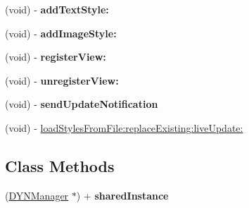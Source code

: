 \begin{DoxyCompactItemize}
\item 
\hypertarget{interface_d_y_n_manager_ae78aea4a00bc874e34cfbd398207f856}{(void) -\/ {\bfseries add\-Text\-Style\-:}}\label{interface_d_y_n_manager_ae78aea4a00bc874e34cfbd398207f856}

\item 
\hypertarget{interface_d_y_n_manager_a9b4b3382af4c326e40a743442ba79f2a}{(void) -\/ {\bfseries add\-Image\-Style\-:}}\label{interface_d_y_n_manager_a9b4b3382af4c326e40a743442ba79f2a}

\item 
\hypertarget{interface_d_y_n_manager_a300c40eaa2d1bc72781fbc9157ecb9c8}{(void) -\/ {\bfseries register\-View\-:}}\label{interface_d_y_n_manager_a300c40eaa2d1bc72781fbc9157ecb9c8}

\item 
\hypertarget{interface_d_y_n_manager_a93223fa54ecdfca7f1069f2ddfb48b7a}{(void) -\/ {\bfseries unregister\-View\-:}}\label{interface_d_y_n_manager_a93223fa54ecdfca7f1069f2ddfb48b7a}

\item 
\hypertarget{interface_d_y_n_manager_a786e30642d4945d36aca461f90082511}{(void) -\/ {\bfseries send\-Update\-Notification}}\label{interface_d_y_n_manager_a786e30642d4945d36aca461f90082511}

\item 
(void) -\/ \hyperlink{interface_d_y_n_manager_a8853c7723ad435b1289ce3d08512ce14}{load\-Styles\-From\-File\-:replace\-Existing\-:live\-Update\-:}
\end{DoxyCompactItemize}
\subsection*{Class Methods}
\begin{DoxyCompactItemize}
\item 
\hypertarget{interface_d_y_n_manager_a0002da3accbccb99fc390fa445cc456a}{(\hyperlink{interface_d_y_n_manager}{D\-Y\-N\-Manager} $\ast$) + {\bfseries shared\-Instance}}\label{interface_d_y_n_manager_a0002da3accbccb99fc390fa445cc456a}

\end{DoxyCompactItemize}
